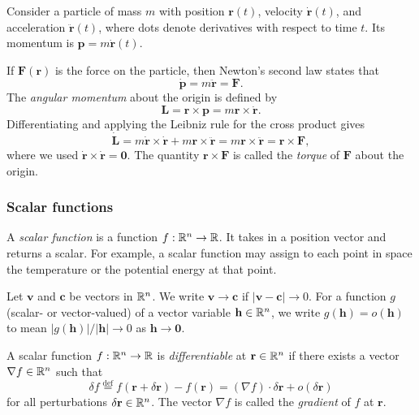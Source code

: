 \documentclass[a4paper]{article}
\begin{document}
\begin{eg}
  Consider a particle of mass $m$ with position $\mathbf{r}(t)$, velocity $\dot{\mathbf{r}}(t)$, and acceleration $\ddot{\mathbf{r}}(t)$, where dots denote derivatives with respect to time $t$. Its momentum is $\mathbf{p} = m\dot{\mathbf{r}}(t)$.

  If $\mathbf{F}(\mathbf{r})$ is the force on the particle, then Newton's second law states that
  \[
    \dot{\mathbf{p}} = m\ddot{\mathbf{r}} = \mathbf{F}.
  \]
  The \emph{angular momentum} about the origin is defined by
  \[
    \mathbf{L} = \mathbf{r}\times \mathbf{p} = m\mathbf{r} \times \dot{\mathbf{r}}.
  \]
  Differentiating and applying the Leibniz rule for the cross product gives
  \[
    \dot{\mathbf{L}} = m\dot{\mathbf{r}}\times \dot{\mathbf{r}} + m\mathbf{r}\times \ddot{\mathbf{r}} = m\mathbf{r}\times \ddot{\mathbf{r}} = \mathbf{r}\times \mathbf{F},
  \]
  where we used $\dot{\mathbf{r}} \times \dot{\mathbf{r}} = \mathbf{0}$. The quantity $\mathbf{r}\times \mathbf{F}$ is called the \emph{torque} of $\mathbf{F}$ about the origin.
\end{eg}

\subsubsection*{Scalar functions }

\begin{defi}
  A \emph{scalar function} is a function $f: \mathbb{R}^n \to \mathbb{R}$. It takes in a position vector and returns a scalar. For example, a scalar function may assign to each point in space the temperature or the potential energy at that point.
\end{defi}

\begin{defi}
  Let $\mathbf{v}$ and $\mathbf{c}$ be vectors in $\mathbb{R}^n$. We write $\mathbf{v}\to \mathbf{c}$ if $|\mathbf{v} - \mathbf{c}| \to 0$. For a function $g$ (scalar- or vector-valued) of a vector variable $\mathbf{h} \in \mathbb{R}^n$, we write $g(\mathbf{h}) = o(\mathbf{h})$ to mean $|g(\mathbf{h})|/|\mathbf{h}| \to 0$ as $\mathbf{h}\to \mathbf{0}$.
\end{defi}

\begin{defi}
  A scalar function $f: \mathbb{R}^n \to \mathbb{R}$ is \emph{differentiable} at $\mathbf{r} \in \mathbb{R}^n$ if there exists a vector $\nabla f \in \mathbb{R}^n$ such that
  \[
    \delta f \stackrel{\text{def}}{=} f(\mathbf{r} + \delta \mathbf{r}) - f(\mathbf{r}) = (\nabla f)\cdot \delta \mathbf{r} + o(\delta \mathbf{r})
  \]
  for all perturbations $\delta \mathbf{r} \in \mathbb{R}^n$. The vector $\nabla f$ is called the \emph{gradient} of $f$ at $\mathbf{r}$.
\end{defi}
\end{document}
